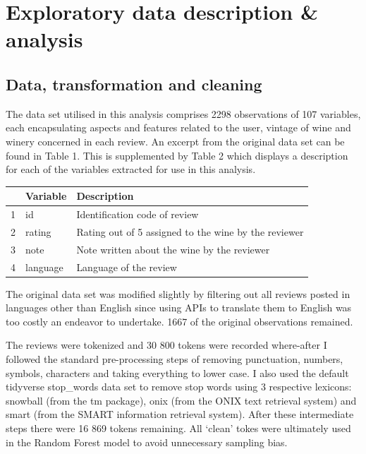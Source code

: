 \documentclass[11pt,preprint]{elsarticle}
\let\origtable\table
\let\endorigtable\endtable
\renewenvironment{table}[1][2] {
    \expandafter\origtable\expandafter[H]
} {
    \endorigtable
}
\numberwithin{equation}{section}
\numberwithin{figure}{section}
\numberwithin{table}{section}
\begin{document}
\newpage

\section{Exploratory data description \&
analysis}\label{exploratory-data-description-analysis}

\label{Data}

\subsection{Data, transformation and
cleaning}\label{data-transformation-and-cleaning}

The data set utilised in this analysis comprises 2298 observations of
107 variables, each encapsulating aspects and features related to the
user, vintage of wine and winery concerned in each review. An excerpt
from the original data set can be found in Table 1. This is supplemented
by Table 2 which displays a description for each of the variables
extracted for use in this analysis.

\begin{table}[ht]
\centering
\begin{tabular}{|r|l|l|}
\hline
\textbf{} & \textbf{Variable} & \textbf{Description} \\
\hline
1 & id & Identification code of review \\
2 & rating & Rating out of 5 assigned to the wine by the reviewer \\
3 & note & Note written about the wine by the reviewer \\
4 & language & Language of the review \\
\hline
\end{tabular}
\caption{Description of Variables}
\label{tab:variables}
\end{table}

The original data set was modified slightly by filtering out all reviews
posted in languages other than English since using APIs to translate
them to English was too costly an endeavor to undertake. 1667 of the
original observations remained.

The reviews were tokenized and 30 800 tokens were recorded where-after I
followed the standard pre-processing steps of removing punctuation,
numbers, symbols, characters and taking everything to lower case. I also
used the default tidyverse stop\_words data set to remove stop words
using 3 respective lexicons: snowball (from the tm package), onix (from
the ONIX text retrieval system) and smart (from the SMART information
retrieval system). After these intermediate steps there were 16 869
tokens remaining. All `clean' tokes were ultimately used in the Random
Forest model to avoid unnecessary sampling bias.
\end{document}
